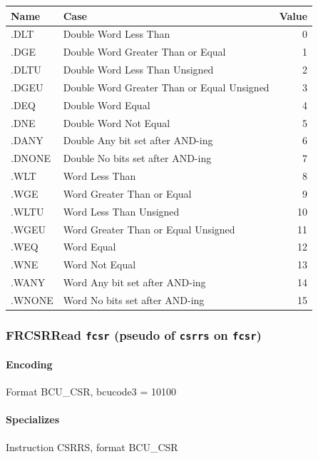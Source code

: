 {\noindent \begin{tabular}{|l|l|r|} \hline
\bf{Name} & \bf{Case} & \bf{Value} \\ \hline
.DLT & Double Word Less Than & 0 \\
.DGE & Double Word Greater Than or Equal & 1 \\
.DLTU & Double Word Less Than Unsigned & 2 \\
.DGEU & Double Word Greater Than or Equal Unsigned & 3 \\
.DEQ & Double Word Equal & 4 \\
.DNE & Double Word Not Equal & 5 \\
.DANY & Double Any bit set after AND-ing & 6 \\
.DNONE & Double No bits set after AND-ing & 7 \\
.WLT & Word Less Than & 8 \\
.WGE & Word Greater Than or Equal & 9 \\
.WLTU & Word Less Than Unsigned & 10 \\
.WGEU & Word Greater Than or Equal Unsigned & 11 \\
.WEQ & Word Equal & 12 \\
.WNE & Word Not Equal & 13 \\
.WANY & Word Any bit set after AND-ing & 14 \\
.WNONE & Word No bits set after AND-ing & 15 \\
\hline \end{tabular}
\newpage
\subsubsection[{\small FRCSR: Read \texttt{fcsr} (pseudo of \texttt{csrrs} on \texttt{fcsr})}]{FRCSR\hfill Read \texttt{fcsr} (pseudo of \texttt{csrrs} on \texttt{fcsr})}
\label{instr:FRCSR}

\paragraph{Encoding} Format \textsf{BCU\_CSR, bcucode3 = 10100}\\



\paragraph{Specializes} Instruction CSRRS, format BCU\_CSR

}
